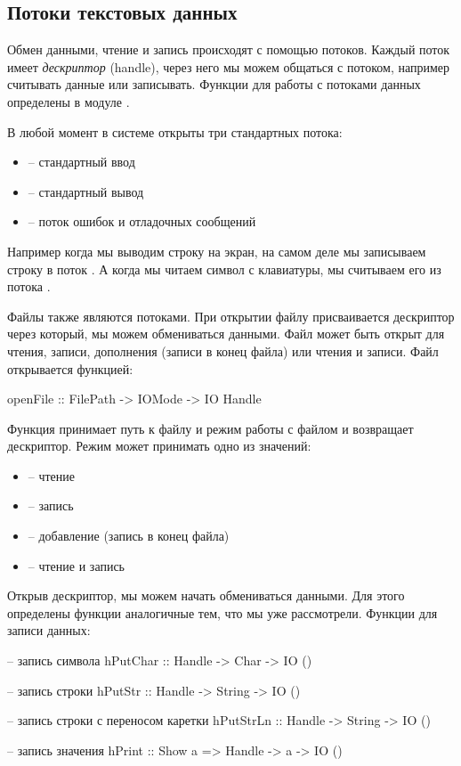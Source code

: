 \subsection{Потоки текстовых данных}

Обмен данными, чтение и запись происходят с помощью потоков. Каждый
поток имеет \emph{дескриптор} (handle), через него мы можем общаться с
потоком, например считывать данные или записывать. Функции для работы с
потоками данных определены в модуле .

В любой момент в системе открыты три стандартных потока:

\begin{itemize}
\item
   -- стандартный ввод
\item
   -- стандартный вывод
\item
   -- поток ошибок и отладочных сообщений
\end{itemize}

Например когда мы выводим строку на экран, на самом деле мы записываем
строку в поток . А когда мы читаем символ с клавиатуры, мы
считываем его из потока .

Файлы также являются потоками. При открытии файлу присваивается
дескриптор через который, мы можем обмениваться данными. Файл может быть
открыт для чтения, записи, дополнения (записи в конец файла) или чтения
и записи. Файл открывается функцией:


\begin{code}
openFile :: FilePath -> IOMode -> IO Handle
\end{code}

Функция принимает путь к файлу и режим работы с файлом и возвращает
дескриптор. Режим может принимать одно из значений:

\begin{itemize}
\item
   -- чтение
\item
   -- запись
\item
   -- добавление (запись в конец файла)
\item
   -- чтение и запись
\end{itemize}

Открыв дескриптор, мы можем начать обмениваться данными. Для этого
определены функции аналогичные тем, что мы уже рассмотрели. Функции для
записи данных:


\begin{code}
-- запись символа
hPutChar :: Handle -> Char -> IO ()

-- запись строки
hPutStr :: Handle -> String -> IO ()

-- запись строки с переносом каретки
hPutStrLn :: Handle -> String -> IO ()

-- запись значения
hPrint :: Show a => Handle -> a -> IO ()
\end{code}

